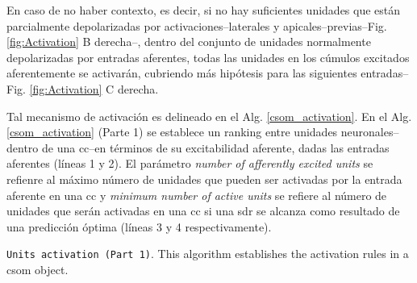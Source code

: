 {En caso de no haber contexto, es decir, si no hay suficientes unidades que están parcialmente depolarizadas 
por activaciones--laterales y apicales--previas--Fig. \ref{fig:Activation} B derecha--,
dentro del conjunto de unidades
normalmente depolarizadas por entradas aferentes,
todas las unidades en los cúmulos excitados aferentemente se activarán, cubriendo más hipótesis para las siguientes entradas--Fig. \ref{fig:Activation} C derecha.

Tal mecanismo de activación es delineado en el Alg. \ref{csom_activation}. En el Alg. \ref{csom_activation} (Parte 1) se establece un ranking entre unidades neuronales--dentro de una \gls{cc}--en términos de su excitabilidad aferente, dadas las entradas aferentes (líneas 1 y 2).
El parámetro \emph{number of afferently excited units} se refienre al máximo número de unidades que pueden ser activadas por la entrada aferente en una \gls{cc} y \emph{minimum number of active units} se refiere al número de unidades que serán activadas en una \gls{cc} si una \gls{sdr} se alcanza como resultado de una predicción óptima (líneas 3 y 4 respectivamente).

\begin{algorithm}
	\caption{\texttt{Units activation (Part 1)}. This algorithm establishes the activation rules in a \gls{csom} object.}
\label{csom_activation}
\begin{algorithmic}[1]




	\ELSE
	\ENDIF


\end{algorithmic}
\end{algorithm}}
